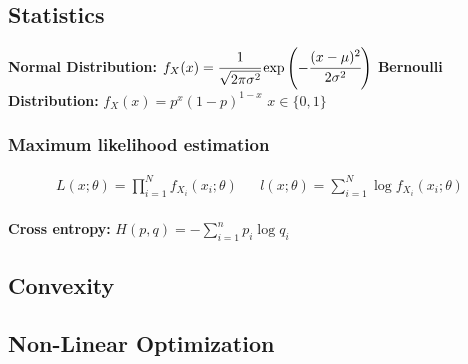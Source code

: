 \begin{mdframed}[style=eqbox]
\subsection{Statistics}
\textbf{Normal Distribution:}
\(f_X(x) = \cfrac{1}{\sqrt{2\pi \sigma^2}} \exp\left(-\cfrac{(x-\mu)^2}{2\sigma^2}\right)\)
\textbf{Bernoulli Distribution:} \(f_X(x) = p^x (1 - p)^{1-x}\) \(x \in \{0, 1\}\)
\subsubsection*{Maximum likelihood estimation}
\vspace*{-10pt}\begin{align*}
  L(x;\theta) = \prod_{i=1}^N f_{X_i}(x_i; \theta) && l(x;\theta) = \sum_{i=1}^N \log f_{X_i}(x_i; \theta)
\end{align*}\vspace*{-10}\\
\textbf{Cross entropy:} $H(p,q) = -\sum_{i=1}^{n} p_i \log q_i$
\end{mdframed}
%
\begin{mdframed}[style=eqbox]
\subsection{Convexity}
\end{mdframed}
%
\begin{mdframed}[style=eqbox]
\subsection{Non-Linear Optimization}
\end{mdframed}